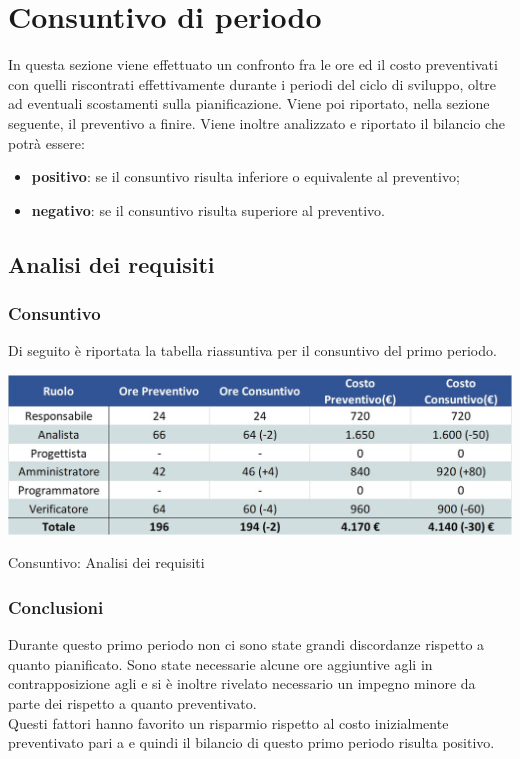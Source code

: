\newpage
\section{Consuntivo di periodo} \label{ConsuntivoPeriodo}

In questa sezione viene effettuato un confronto fra le ore ed il costo preventivati con quelli riscontrati effettivamente durante i periodi del ciclo di sviluppo, oltre ad eventuali scostamenti sulla pianificazione. Viene poi riportato, nella sezione seguente, il preventivo a finire.
Viene inoltre analizzato e riportato il bilancio che potrà essere:
\begin{itemize}
	\item \textbf{positivo}: se il consuntivo risulta inferiore o equivalente al preventivo;
	\item \textbf{negativo}: se il consuntivo risulta superiore al preventivo.
\end{itemize}

\subsection{Analisi dei requisiti}
\subsubsection{Consuntivo}
Di seguito è riportata la tabella riassuntiva per il consuntivo del primo periodo.
\begin{table}[h!]
	\centerline{\includegraphics[scale=0.55]{img/Preventivo/Consuntivo/AnalisiRequisitiConsuntivo.jpg}}
	\caption{Consuntivo: Analisi dei requisiti}
\end{table}

\subsubsection{Conclusioni}
Durante questo primo periodo non ci sono state grandi discordanze rispetto a quanto pianificato. Sono state necessarie alcune ore aggiuntive agli \adms{} in contrapposizione agli \anas{} e si è inoltre rivelato necessario un impegno minore da parte dei \vers{} rispetto a quanto preventivato.\\
Questi fattori hanno favorito un risparmio rispetto al costo inizialmente preventivato pari a  e quindi il bilancio di questo primo periodo risulta positivo.

